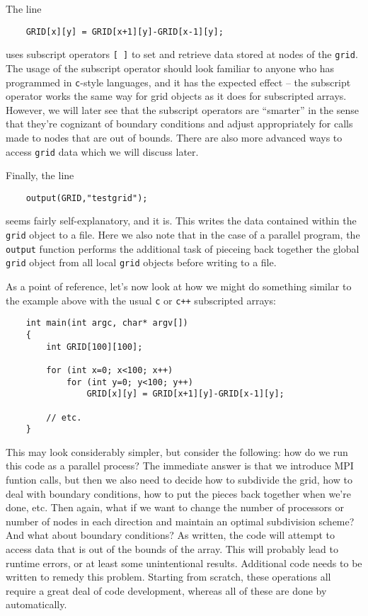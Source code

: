 The line
\begin{shadebox}
\begin{verbatim}
    GRID[x][y] = GRID[x+1][y]-GRID[x-1][y];
\end{verbatim}
\end{shadebox}
uses subscript operators {\tt [ ]} to set and retrieve data stored at nodes of the {\tt grid}.  The usage of the subscript operator should look familiar to anyone who has programmed in {\tt c}-style languages, and it has the expected effect -- the subscript operator works the same way for \MMSP grid objects as it does for subscripted arrays.  However, we will later see that the \MMSP subscript operators are ``smarter'' in the sense that they're cognizant of boundary conditions and adjust appropriately for calls made to nodes that are out of bounds.  There are also more advanced ways to access {\tt grid} data which we will discuss later.

Finally, the line 
\begin{shadebox}
\begin{verbatim}
    output(GRID,"testgrid");
\end{verbatim}
\end{shadebox}
seems fairly self-explanatory, and it is.  This writes the data contained within the {\tt grid} object to a file.  Here we also note that in the case of a parallel program, the {\tt output} function performs the additional task of pieceing back together the global {\tt grid} object from all local {\tt grid} objects before writing to a file.

As a point of reference, let's now look at how we might do something similar to the example above with the usual {\tt c} or {\tt c++} subscripted arrays:
\begin{shadebox}
\begin{verbatim}
    int main(int argc, char* argv[])
    {
        int GRID[100][100];

        for (int x=0; x<100; x++)
            for (int y=0; y<100; y++)
                GRID[x][y] = GRID[x+1][y]-GRID[x-1][y];

        // etc.
    }
\end{verbatim}
\end{shadebox}
This may look considerably simpler, but consider the following: how do we run this code as a parallel process?  The immediate answer is that we introduce MPI funtion calls, but then we also need to decide how to subdivide the grid, how to deal with boundary conditions, how to put the pieces back together when we're done, etc.  Then again, what if we want to change the number of processors or number of nodes in each direction and maintain an optimal subdivision scheme?  And what about boundary conditions?  As written, the code will attempt to access data that is out of the bounds of the array.  This will probably lead to runtime errors, or at least some unintentional results.  Additional code needs to be written to remedy this problem.  Starting from scratch, these operations all require a great deal of code development, whereas all of these are done by \MMSP automatically.


